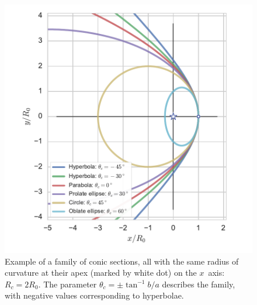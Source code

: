 \begin{figure}
\includegraphics[width=\linewidth]{conic1}
\caption{Example of a family of conic sections, all with the same
  radius of curvature at their apex (marked by white dot) on the
  \(x\)~axis: \(R_c = 2 R_0\). The parameter
  $\theta_c = \pm \tan^{-1} b/a$ describes the family, with negative
  values corresponding to hyperbolae.}
\label{fig:conics-family}
\end{figure}

